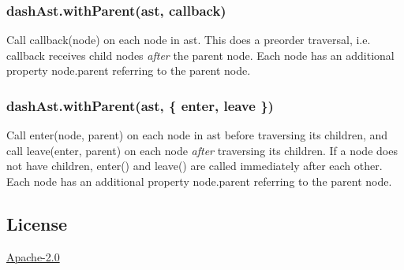 \subsubsection*{{\ttfamily dash\+Ast.\+with\+Parent(ast, callback)}}

Call {\ttfamily callback(node)} on each node in {\ttfamily ast}. This does a preorder traversal, i.\+e. {\ttfamily callback} receives child nodes {\itshape after} the parent node. Each {\ttfamily node} has an additional property {\ttfamily node.\+parent} referring to the parent node.

\subsubsection*{{\ttfamily dash\+Ast.\+with\+Parent(ast, \{ enter, leave \})}}

Call {\ttfamily enter(node, parent)} on each node in {\ttfamily ast} before traversing its children, and call {\ttfamily leave(enter, parent)} on each node {\itshape after} traversing its children. If a node does not have children, {\ttfamily enter()} and {\ttfamily leave()} are called immediately after each other. Each {\ttfamily node} has an additional property {\ttfamily node.\+parent} referring to the parent node.

\subsection*{License}

\mbox{\hyperlink{md_LICENSE}{Apache-\/2.0}} 